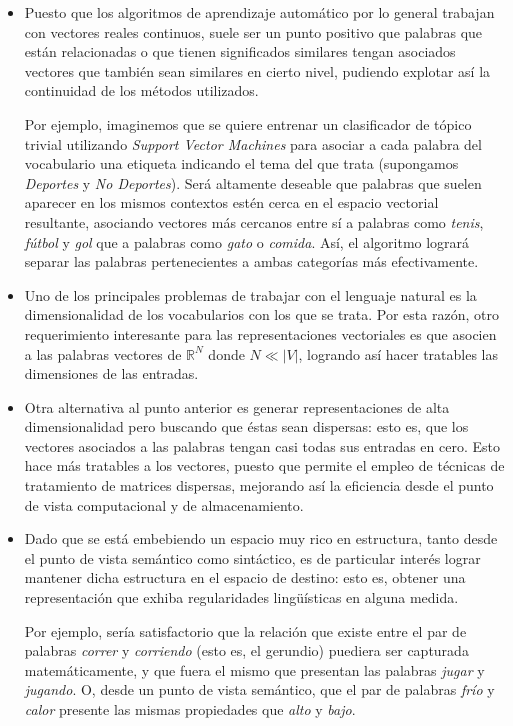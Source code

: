 \begin{itemize}

\item Puesto que los algoritmos de aprendizaje automático por lo general trabajan con vectores
reales continuos, suele ser un punto positivo que palabras que están relacionadas o que tienen
significados similares tengan asociados vectores que también sean similares en cierto nivel,
pudiendo explotar así la continuidad de los métodos utilizados.

Por ejemplo, imaginemos que se quiere entrenar un clasificador de tópico trivial utilizando
\textit{Support Vector Machines} para asociar a cada palabra del vocabulario una etiqueta indicando
el tema del que trata (supongamos \textit{Deportes} y \textit{No Deportes}). Será altamente deseable
que palabras que suelen aparecer en los mismos contextos estén cerca en el espacio vectorial
resultante, asociando vectores más cercanos entre sí a palabras como \textit{tenis}, \textit{fútbol}
y \textit{gol} que a palabras como \textit{gato} o \textit{comida}. Así, el algoritmo logrará
separar las palabras pertenecientes a ambas categorías más efectivamente.

\item Uno de los principales problemas de trabajar con el lenguaje natural es la dimensionalidad de
los vocabularios con los que se trata. Por esta razón, otro requerimiento interesante para las
representaciones vectoriales es que asocien a las palabras vectores de $\mathbb{R}^N$ donde $N \ll
|V|$, logrando así hacer tratables las dimensiones de las entradas.

\item Otra alternativa al punto anterior es generar representaciones de alta dimensionalidad pero
buscando que éstas sean dispersas: esto es, que los vectores asociados a las palabras tengan casi
todas sus entradas en cero. Esto hace más tratables a los vectores, puesto que permite el empleo de
técnicas de tratamiento de matrices dispersas, mejorando así la eficiencia desde el punto de vista
computacional y de almacenamiento.

\item Dado que se está embebiendo un espacio muy rico en estructura, tanto desde el punto de vista
semántico como sintáctico, es de particular interés lograr mantener dicha estructura en el espacio
de destino: esto es, obtener una representación que exhiba regularidades lingüísticas en alguna
medida.

Por ejemplo, sería satisfactorio que la relación que existe entre el par de palabras \textit{correr}
y \textit{corriendo} (esto es, el gerundio) puediera ser capturada matemáticamente, y que fuera el
mismo que presentan las palabras \textit{jugar} y \textit{jugando}. O, desde un punto de vista
semántico, que el par de palabras \textit{frío} y \textit{calor} presente las mismas propiedades que
\textit{alto} y \textit{bajo}.

\end{itemize}


